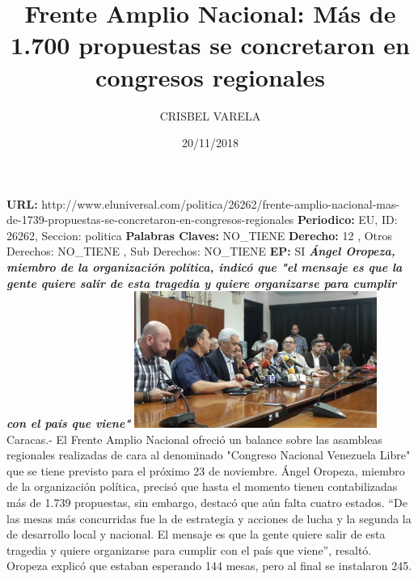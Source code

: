 \documentclass{article}%
\title{\textbf{Frente Amplio Nacional: Más de 1.700 propuestas se concretaron en congresos regionales}}%
\author{CRISBEL VARELA}%
\date{20/11/2018}%
\begin{document}
%
\normalsize%
\maketitle%
\textbf{URL: }%
http://www.eluniversal.com/politica/26262/frente{-}amplio{-}nacional{-}mas{-}de{-}1739{-}propuestas{-}se{-}concretaron{-}en{-}congresos{-}regionales\newline%
%
\textbf{Periodico: }%
EU, %
ID: %
26262, %
Seccion: %
politica\newline%
%
\textbf{Palabras Claves: }%
NO\_TIENE\newline%
%
\textbf{Derecho: }%
12%
, Otros Derechos: %
NO\_TIENE%
, Sub Derechos: %
NO\_TIENE%
\newline%
%
\textbf{EP: }%
SI\newline%
\newline%
%
\textbf{\textit{Ángel Oropeza, miembro de la organización política, indicó que "el mensaje es que la gente quiere salir de esta tragedia y quiere organizarse para cumplir con el país que viene"}}%
\newline%
\newline%
%
\includegraphics[width=300px]{22.jpg}%
\newline%
%
Caracas.{-} El Frente Amplio Nacional ofreció un balance sobre las asambleas regionales realizadas de cara al denominado "Congreso Nacional Venezuela Libre" que se tiene previsto para el próximo 23 de noviembre.%
\newline%
%
Ángel Oropeza, miembro de la organización política, precisó que hasta el momento tienen contabilizadas más de 1.739 propuestas, sin embargo, destacó que aún falta cuatro estados.%
\newline%
%
“De las mesas más concurridas fue la de estrategia y acciones de lucha y la segunda la de desarrollo local y nacional. El mensaje es que la gente quiere salir de esta tragedia y quiere organizarse para cumplir con el país que viene”, resaltó.%
\newline%
%
Oropeza explicó que estaban esperando 144 mesas, pero al final se instalaron 245.%
\newline%
%
\end{document}
